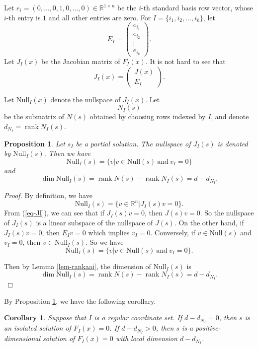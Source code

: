 \documentclass[10pt,a4paper]{amsart}
\newtheorem{corollary}[theorem]{Corollary}
\newtheorem{proposition}[theorem]{Proposition}
\numberwithin{equation}{section}
\begin{document}
Let $e_i = (0,\ldots,0,1,0,\ldots,0) \in \mathbb{R}^{1\times n}$ be the $i$-th standard basis row vector, whose $i$-th entry is $1$ and all other entries are zero. For $I=\{i_1,i_2,\ldots,i_k\}$, let
$$E_I=\left(
\begin{array}{c}
e_{i_1}\\
e_{i_2}\\
\vdots\\
e_{i_k}
\end{array}
\right).
$$
Let $J_I(x)$ be the Jacobian matrix of $F_I(x)$. It is not hard to see that 
\begin{equation}\label{eq-JI}
 J_I(x)=\left(
\begin{array}{c}
J(x)\\
E_I
\end{array}
\right).
\end{equation}

Let $\mathrm{Null}_I(x)$ denote the nullspace of $J_I(x)$. Let 
\begin{equation}\label{eq-nis}
N_I(s) 
\end{equation}
be the submatrix of $N(s)$ obtained by choosing rows indexed by $I$, and denote $d_{N_I}=\operatorname{rank}N_I(s)$.

\begin{proposition}\label{prop-nbm}
Let $s_I$ be a partial solution.
The nullspace of $J_I(s)$ is denoted by $\mathrm{Null}_I(s)$.
Then we have
$$\mathrm{Null}_I(s)=\{v|v\in \mathrm{Null}(s)~\text{and}~v_I=0\}$$
and
$$\dim \mathrm{Null}_I(s)=\operatorname{rank}N(s)-\operatorname{rank}N_I(s)=d-d_{N_I}.$$
\end{proposition}
\begin{proof}
By definition,   we have
$$\mathrm{Null}_I(s)=\{v\in \mathbb{R}^n| J_I(s)v=0\}.$$
From (\ref{eq-JI}), we can see that
if $J_I(s)v=0$, then $J(s)v=0$. So the nullspace of $J_I(s)$ is a linear subspace of the nullspace of $J(s)$.
On the other hand, if $J_I(s)v=0$, then $E_I v=0$ which implies $v_I=0$.
Conversely, if $v\in \mathrm{Null}(s)$ and $v_I=0$, then $v\in \mathrm{Null}_I(s)$.
So we have 
$$\mathrm{Null}_I(s)=\{v|v\in \mathrm{Null}(s)~\text{and}~v_I=0\}.$$

Then by Lemma \ref{lem-rankaai}, the dimension of $\mathrm{Null}_I(s)$ is
$$\dim \mathrm{Null}_I(s)=\operatorname{rank}N(s)-\operatorname{rank}N_I(s)=d-d_{N_I}.$$
\end{proof}
By Proposition \ref{prop-nbm}, we have the following corollary.
\begin{corollary}\label{cor-ddi}
Suppose that $I$ is a regular coordinate set.
If $d-d_{N_I}=0$, then $s$ is an isolated solution of $F_I(x)=0$.
If $d-d_{N_I}>0$, then $s$ is a positive-dimensional solution of $F_I(x)=0$ with local dimension $d-d_{N_I}$.
\end{corollary}
\end{document}
